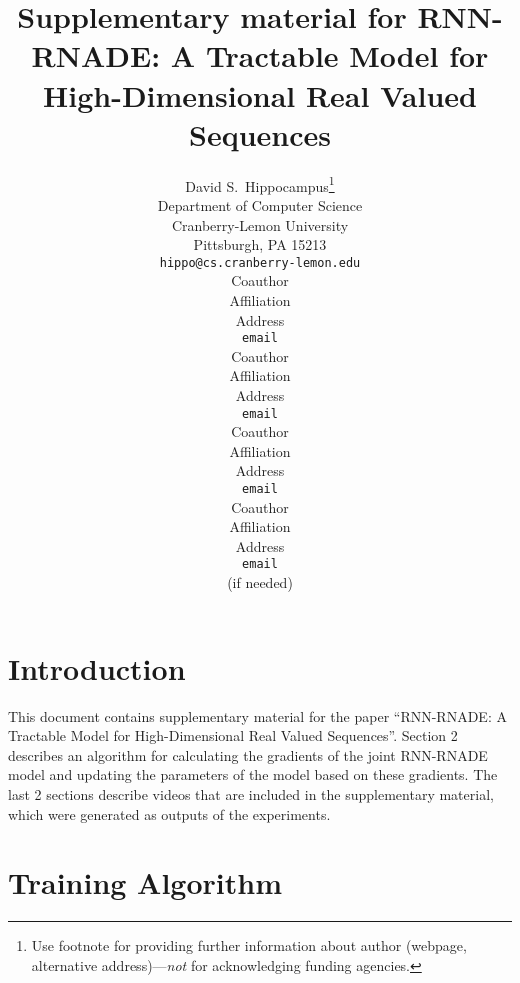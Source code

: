 \documentclass{article} %
\title{Supplementary material for RNN-RNADE: A Tractable Model for High-Dimensional Real Valued Sequences}
\author{
David S.~Hippocampus\thanks{ Use footnote for providing further information
about author (webpage, alternative address)---\emph{not} for acknowledging
funding agencies.} \\
Department of Computer Science\\
Cranberry-Lemon University\\
Pittsburgh, PA 15213 \\
\texttt{hippo@cs.cranberry-lemon.edu} \\
\And
Coauthor \\
Affiliation \\
Address \\
\texttt{email} \\
\AND
Coauthor \\
Affiliation \\
Address \\
\texttt{email} \\
\And
Coauthor \\
Affiliation \\
Address \\
\texttt{email} \\
\And
Coauthor \\
Affiliation \\
Address \\
\texttt{email} \\
(if needed)\\
}
\begin{document}
\maketitle


\section{Introduction}

This document contains supplementary material for the paper ``RNN-RNADE: A Tractable Model for High-Dimensional Real Valued Sequences''. Section 2 describes an algorithm for calculating the gradients of the joint RNN-RNADE model and updating the parameters of the model based on these gradients. The last 2 sections describe videos that are included in the supplementary material, which were generated as outputs of the experiments. 

\section{Training Algorithm}
\end{document}
